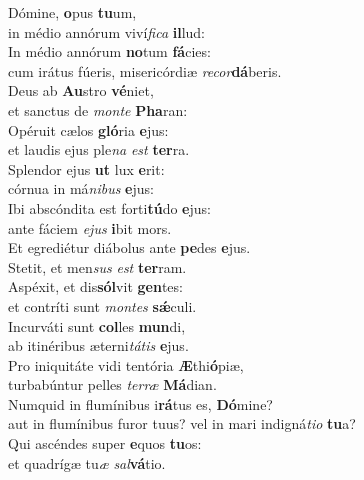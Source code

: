 \evenverse Dómine, \textbf{o}pus \textbf{tu}um,~\*\\
\evenverse in médio annórum viví\textit{fi}\textit{ca} \textbf{il}lud:\\
\oddverse In médio annórum \textbf{no}tum \textbf{fá}cies:~\*\\
\oddverse cum irátus fúeris, misericórdiæ \textit{re}\textit{cor}\textbf{dá}beris.\\
\evenverse Deus ab \textbf{Au}stro \textbf{vé}niet,~\*\\
\evenverse et sanctus de \textit{mon}\textit{te} \textbf{Pha}ran:\\
\oddverse Opéruit cælos \textbf{gló}ria \textbf{e}jus:~\*\\
\oddverse et laudis ejus ple\textit{na} \textit{est} \textbf{ter}ra.\\
\evenverse Splendor ejus \textbf{ut} lux \textbf{e}rit:~\*\\
\evenverse córnua in má\textit{ni}\textit{bus} \textbf{e}jus:\\
\oddverse Ibi abscóndita est forti\textbf{tú}do \textbf{e}jus:~\*\\
\oddverse ante fáciem \textit{e}\textit{jus} \textbf{i}bit mors.\\
\evenverse Et egrediétur diábolus ante \textbf{pe}des \textbf{e}jus.~\*\\
\evenverse Stetit, et men\textit{sus} \textit{est} \textbf{ter}ram.\\
\oddverse Aspéxit, et dis\textbf{sól}vit \textbf{gen}tes:~\*\\
\oddverse et contríti sunt \textit{mon}\textit{tes} \textbf{sǽ}culi.\\
\evenverse Incurváti sunt \textbf{col}les \textbf{mun}di,~\*\\
\evenverse ab itinéribus æterni\textit{tá}\textit{tis} \textbf{e}jus.\\
\oddverse Pro iniquitáte vidi tentória \textbf{Æ}thi\textbf{ó}piæ,~\*\\
\oddverse turbabúntur pelles \textit{ter}\textit{ræ} \textbf{Má}dian.\\
\evenverse Numquid in flumínibus i\textbf{rá}tus es, \textbf{Dó}mine?~\*\\
\evenverse aut in flumínibus furor tuus? vel in mari indigná\textit{ti}\textit{o} \textbf{tu}a?\\
\oddverse Qui ascéndes super \textbf{e}quos \textbf{tu}os:~\*\\
\oddverse et quadrígæ tu\textit{æ} \textit{sal}\textbf{vá}tio.\\
